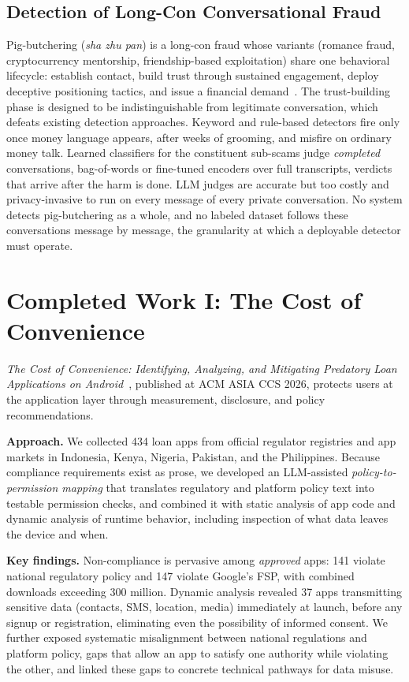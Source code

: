 \documentclass[letterpaper,11pt]{article}
\begin{document}
\subsection{Detection of Long-Con Conversational Fraud}
Pig-butchering (\emph{sha zhu pan}) is a long-con fraud whose variants
(romance fraud, cryptocurrency mentorship, friendship-based
exploitation) share one behavioral lifecycle: establish contact, build
trust through sustained engagement, deploy deceptive positioning
tactics, and issue a financial
demand~\cite{cross2023romance,ic32023}. The trust-building phase is
designed to be indistinguishable from legitimate conversation, which
defeats existing detection approaches. Keyword and rule-based
detectors fire only once money language appears, after weeks of
grooming, and misfire on ordinary money talk. Learned classifiers for
the constituent sub-scams judge \emph{completed} conversations,
bag-of-words or fine-tuned encoders over full transcripts, verdicts
that arrive after the harm is done. LLM judges are accurate but too
costly and privacy-invasive to run on every message of every private
conversation. No system detects pig-butchering as a whole, and no
labeled dataset follows these conversations message by message, the
granularity at which a deployable detector must operate.

\section{Completed Work I: The Cost of Convenience}
\label{sec:loanapps}

\emph{The Cost of Convenience: Identifying, Analyzing, and Mitigating
Predatory Loan Applications on Android}~\cite{akanji2026cost},
published at ACM ASIA CCS 2026, protects users at the application
layer through measurement, disclosure, and policy recommendations.

\textbf{Approach.} We collected 434 loan apps from official regulator
registries and app markets in Indonesia, Kenya, Nigeria, Pakistan, and
the Philippines. Because compliance requirements exist as prose, we
developed an LLM-assisted \emph{policy-to-permission mapping} that
translates regulatory and platform policy text into testable
permission checks, and combined it with static analysis of app code
and dynamic analysis of runtime behavior, including inspection of what
data leaves the device and when.

\textbf{Key findings.} Non-compliance is pervasive among
\emph{approved} apps: 141 violate national regulatory policy and 147
violate Google's FSP, with combined downloads exceeding 300 million.
Dynamic analysis revealed 37 apps transmitting sensitive data
(contacts, SMS, location, media) immediately at launch, before any
signup or registration, eliminating even the possibility of informed
consent. We further exposed systematic misalignment between national
regulations and platform policy, gaps that allow an app to satisfy one
authority while violating the other, and linked these gaps to concrete
technical pathways for data misuse.
\end{document}
